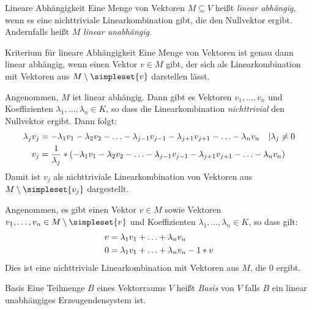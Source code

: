 \begin{definition}{Lineare Abhängigkeit}
\label{satz:lineareUnabhaengigkeit} Eine Menge von Vektoren $M\subseteq V$ heißt \emph{linear abhängig}, wenn es eine nichttriviale Linearkombination gibt, die den Nullvektor ergibt. Andernfalls heißt $M$ \emph{linear unabhängig}.
\end{definition}


\begin{satz}{Kriterium für lineare Abhängigkeit}
  Eine Menge von Vektoren ist genau dann linear abhängig, wenn einen Vektor $v\in M$ gibt, der sich als Linearkombination mit Vektoren aus $M\setminus\simpleset{v}$ darstellen lässt.
\end{satz}


\begin{description}
  \newcommand{\lv}[1]{\ensuremath\lambda_{#1}v_{#1}}
  \item[\glqq$\Rightarrow$\grqq] Angenommen, $M$ ist linear abhängig. Dann gibt es Vektoren $v_1,\ldots,v_n$ und Koeffizienten $\lambda_1,\ldots,\lambda_n \in K$, so dass die Linearkombination \emph{nichttrivial} den Nullvektor ergibt. Dann folgt:
  \begin{align*}
    \lv{j} &= -\lv{1}-\lv{2}-\ldots-\lv{j-1}-\lv{j+1}-\ldots-\lv{n} \quad |\lambda_j\neq0\\
    v_j &= \frac{1}{\lambda_j} * \left( -\lv{1}-\lv{2}-\ldots-\lv{j-1}-\lv{j+1}-\ldots-\lv{n} \right)
  \end{align*}
  Damit ist $v_j$ als nichttriviale Linearkombination von Vektoren aus $M\setminus\simpleset{v_j}$ dargestellt.


  \item[\glqq$\Leftarrow$\grqq] Angenommen, es gibt einen Vektor $v\in M$ sowie Vektoren $v_1,\ldots,v_n\in M\setminus\simpleset{v}$ und Koeffizienten $\lambda_1,\ldots,\lambda_n \in K$, so dass gilt:
  \begin{align*}
    v &= \lv{1}+\ldots+\lv{n}\\
    0 &= \lv{1}+\ldots+\lv{n} - 1*v
  \end{align*}
  Dies ist eine nichttriviale Linearkombination mit Vektoren aus $M$, die $0$ ergibt.
\end{description}


\begin{definition}{Basis}
	Eine Teilmenge $B$ eines Vektorraums $V$ heißt \emph{Basis} von $V$ falls $B$ ein linear unabhängiges Erzeugendensystem ist.
\end{definition}


